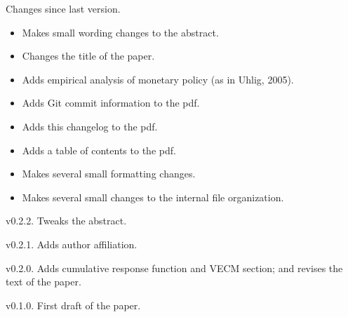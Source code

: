 \begin{description}
\item{Changes since last version.}
  \begin{itemize}[noitemsep]
  \item Makes small wording changes to the abstract.
  \item Changes the title of the paper.
  \item Adds empirical analysis of monetary policy (as in Uhlig, 2005).
  \item Adds Git commit information to the pdf.
  \item Adds this changelog to the pdf.
  \item Adds a table of contents to the pdf.
  \item Makes several small formatting changes.
  \item Makes several small changes to the internal file organization.
  \end{itemize}

\item{v0.2.2.} Tweaks the abstract.

\item{v0.2.1.} Adds author affiliation.

\item{v0.2.0.} Adds cumulative response function and VECM section; and
  revises the text of the paper.

\item{v0.1.0.} First draft of the paper.
\end{description}

